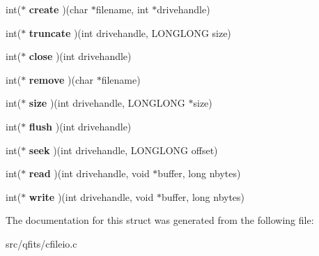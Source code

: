 \begin{DoxyCompactItemize}
int($\ast$ {\bfseries create} )(char $\ast$filename, int $\ast$drivehandle)
\item 
\mbox{\label{structfitsdriver_acb66e7d29209183df77cb4bb0714174f}} 
int($\ast$ {\bfseries truncate} )(int drivehandle, L\+O\+N\+G\+L\+O\+NG size)
\item 
\mbox{\label{structfitsdriver_ab5a195ffd4bb90d8b59cdbe4e895baea}} 
int($\ast$ {\bfseries close} )(int drivehandle)
\item 
\mbox{\label{structfitsdriver_a63309b8f1d4849469deb38612abd8794}} 
int($\ast$ {\bfseries remove} )(char $\ast$filename)
\item 
\mbox{\label{structfitsdriver_adc689e74578d7085b58410ca36e66649}} 
int($\ast$ {\bfseries size} )(int drivehandle, L\+O\+N\+G\+L\+O\+NG $\ast$size)
\item 
\mbox{\label{structfitsdriver_ab2c60ec8e4935cea40002b4b9fce343d}} 
int($\ast$ {\bfseries flush} )(int drivehandle)
\item 
\mbox{\label{structfitsdriver_afa75d77de519bc61f57ac9544cbcc0d4}} 
int($\ast$ {\bfseries seek} )(int drivehandle, L\+O\+N\+G\+L\+O\+NG offset)
\item 
\mbox{\label{structfitsdriver_a2adde64576300000880f933423feaf4e}} 
int($\ast$ {\bfseries read} )(int drivehandle, void $\ast$buffer, long nbytes)
\item 
\mbox{\label{structfitsdriver_ab08c964cbd56a9c04a3536407c54c560}} 
int($\ast$ {\bfseries write} )(int drivehandle, void $\ast$buffer, long nbytes)
\end{DoxyCompactItemize}


The documentation for this struct was generated from the following file\+:\begin{DoxyCompactItemize}
\item 
src/qfits/cfileio.\+c\end{DoxyCompactItemize}

